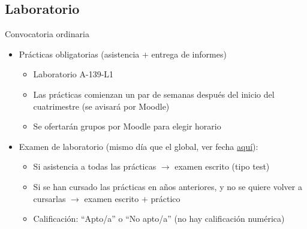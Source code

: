 \documentclass[aspectratio=169, usenames,svgnames,dvipsnames]{beamer}
\begin{document}

\subsection*{Laboratorio}

\begin{frame}{Convocatoria ordinaria}

    
    \begin{itemize}
        \item \alert{Prácticas obligatorias} (asistencia $+$ entrega de informes)
        \vspace{1mm}
        \begin{itemize}
            \item 
            {\normalsize Laboratorio A-139-L1}
            \vspace{2mm}
            \item {\normalsize Las prácticas comienzan un par de semanas después del inicio del cuatrimestre (se avisará por Moodle)}
            \vspace{2mm}
            \item {\normalsize Se ofertarán grupos por Moodle para elegir horario}
            \end{itemize}
        
        \vspace{2.5mm}
        \item \alert{Examen de laboratorio} (mismo día que el global, ver fecha \href{https://www.etsidi.upm.es/Estudiantes/AgendaAcademica/AAFechaExamenes}{aquí}):
        \vspace{1mm}
            \begin{itemize}           
            \item {\normalsize Si \alert{asistencia a todas las prácticas} $\rightarrow$ examen escrito (tipo test)}
            \vspace{2mm}
            \item {\normalsize Si se han cursado las prácticas en años anteriores, y no se quiere volver a cursarlas $\rightarrow$ examen escrito $+$ práctico}
            \vspace{2mm}
            \item {\normalsize Calificación: ``\alert{Apto/a}'' o ``\alert{No apto/a}'' (no hay calificación numérica)}
            \end{itemize}
        \end{itemize}

\end{frame}
\end{document}
